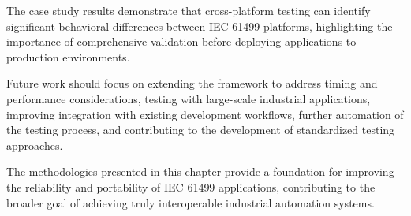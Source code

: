 The case study results demonstrate that cross-platform testing can identify significant behavioral differences between IEC 61499 platforms, highlighting the importance of comprehensive validation before deploying applications to production environments.

Future work should focus on extending the framework to address timing and performance considerations, testing with large-scale industrial applications, improving integration with existing development workflows, further automation of the testing process, and contributing to the development of standardized testing approaches.

The methodologies presented in this chapter provide a foundation for improving the reliability and portability of IEC 61499 applications, contributing to the broader goal of achieving truly interoperable industrial automation systems.
